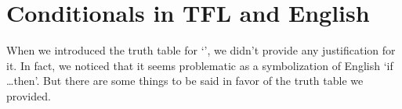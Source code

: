 %



\section{Conditionals in TFL and English}\label{s:TFLConditional}

When we introduced the truth table for `\eif', we didn't provide any justification for it.  In fact, we noticed that it seems problematic as a symbolization of English `if \ldots then'.  But there are some things to be said in favor of the truth table we provided.


